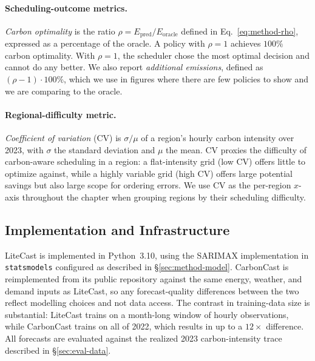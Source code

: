 \paragraph{Scheduling-outcome metrics.}
\textit{Carbon optimality} is the ratio $\rho = E_{\text{pred}} / E_{\text{oracle}}$ defined in Eq.~\ref{eq:method-rho}, expressed as a percentage of the oracle.
A policy with $\rho = 1$ achieves $100\%$ carbon optimality. 
With $\rho = 1$, the scheduler chose the most optimal decision and cannot do any better.
We also report \textit{additional emissions}, defined as $(\rho - 1) \cdot 100\%$, which we use in figures where there are few policies to show and we are comparing to the oracle.

\paragraph{Regional-difficulty metric.}
\textit{Coefficient of variation} (CV) is $\sigma / \mu$ of a region's hourly carbon intensity over 2023, with $\sigma$ the standard deviation and $\mu$ the mean.
CV proxies the difficulty of carbon-aware scheduling in a region: a flat-intensity grid (low CV) offers little to optimize against, while a highly variable grid (high CV) offers large potential savings but also large scope for ordering errors.
We use CV as the per-region $x$-axis throughout the chapter when grouping regions by their scheduling difficulty.

\subsection{Implementation and Infrastructure}
\label{sec:eval-implementation}

LiteCast is implemented in Python~3.10, using the SARIMAX implementation in \texttt{statsmodels} \cite{statsmodels} configured as described in \S\ref{sec:method-model}.
CarbonCast is reimplemented from its public repository against the same energy, weather, and demand inputs as LiteCast, so any forecast-quality differences between the two reflect modelling choices and not data access.
The contrast in training-data size is substantial: LiteCast trains on a month-long window of hourly observations, while CarbonCast trains on all of 2022, which results in up to a $12\times$ difference.
All forecasts are evaluated against the realized 2023 carbon-intensity trace described in \S\ref{sec:eval-data}.

